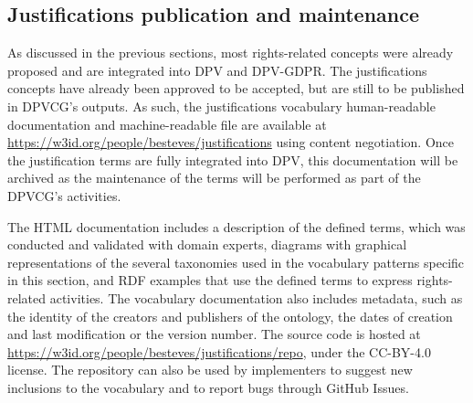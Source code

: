 \subsection{Justifications publication and maintenance}
\label{sec:justifications_publication}

As discussed in the previous sections, most rights-related concepts were already proposed and are integrated into DPV and DPV-GDPR.
The justifications concepts have already been approved to be accepted, but are still to be published in DPVCG's outputs.
As such, the justifications vocabulary human-readable documentation and machine-readable file are available at \url{https://w3id.org/people/besteves/justifications} using content negotiation.
Once the justification terms are fully integrated into DPV, this documentation will be archived as the maintenance of the terms will be performed as part of the DPVCG's activities.

The HTML documentation includes a description of the defined terms, which was conducted and validated with domain experts, diagrams with graphical representations of the several taxonomies used in the vocabulary patterns specific in this section, and RDF examples that use the defined terms to express rights-related activities.
The vocabulary documentation also includes metadata, such as the identity of the creators and publishers of the ontology, the dates of creation and last modification or the version number.
The source code is hosted at \url{https://w3id.org/people/besteves/justifications/repo}, under the CC-BY-4.0 license.
The repository can also be used by implementers to suggest new inclusions to the vocabulary and to report bugs through GitHub Issues.
